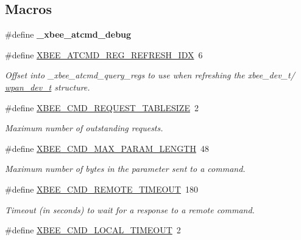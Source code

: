 \subsection*{Macros}
\begin{DoxyCompactItemize}
\item 
\mbox{\label{group__xbee__atcmd_gaa0a5c0b4df3e37c4a829f4675818fbbf}} 
\#define {\bfseries \+\_\+xbee\+\_\+atcmd\+\_\+debug}
\item 
\#define \hyperlink{group__xbee__atcmd_ga23209b601f70aa30a5a6997c9baf313e}{X\+B\+E\+E\+\_\+\+A\+T\+C\+M\+D\+\_\+\+R\+E\+G\+\_\+\+R\+E\+F\+R\+E\+S\+H\+\_\+\+I\+DX}~6
\begin{DoxyCompactList}\small\item\em Offset into \+\_\+xbee\+\_\+atcmd\+\_\+query\+\_\+regs to use when refreshing the xbee\+\_\+dev\+\_\+t/ \hyperlink{structwpan__dev__t}{wpan\+\_\+dev\+\_\+t} structure. \end{DoxyCompactList}\item 
\#define \hyperlink{group__xbee__atcmd_gaf992e9b985e2b1eb185ef3d2d38a01c0}{X\+B\+E\+E\+\_\+\+C\+M\+D\+\_\+\+R\+E\+Q\+U\+E\+S\+T\+\_\+\+T\+A\+B\+L\+E\+S\+I\+ZE}~2
\begin{DoxyCompactList}\small\item\em Maximum number of outstanding requests. \end{DoxyCompactList}\item 
\#define \hyperlink{group__xbee__atcmd_ga9b1046f9c200c1bb0a9b57cb0ec474df}{X\+B\+E\+E\+\_\+\+C\+M\+D\+\_\+\+M\+A\+X\+\_\+\+P\+A\+R\+A\+M\+\_\+\+L\+E\+N\+G\+TH}~48
\begin{DoxyCompactList}\small\item\em Maximum number of bytes in the parameter sent to a command. \end{DoxyCompactList}\item 
\#define \hyperlink{group__xbee__atcmd_ga386fdd4cf7046c98379878dab89e5012}{X\+B\+E\+E\+\_\+\+C\+M\+D\+\_\+\+R\+E\+M\+O\+T\+E\+\_\+\+T\+I\+M\+E\+O\+UT}~180
\begin{DoxyCompactList}\small\item\em Timeout (in seconds) to wait for a response to a remote command. \end{DoxyCompactList}\item 
\mbox{\label{group__xbee__atcmd_gae5e93a4c6f52f5853d19a8b4a78810a6}} 
\#define \hyperlink{group__xbee__atcmd_gae5e93a4c6f52f5853d19a8b4a78810a6}{X\+B\+E\+E\+\_\+\+C\+M\+D\+\_\+\+L\+O\+C\+A\+L\+\_\+\+T\+I\+M\+E\+O\+UT}~2

\end{DoxyCompactItemize}

